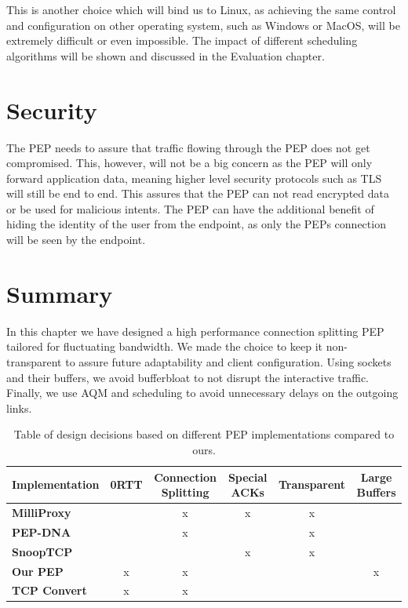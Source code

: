 \documentclass[a4paper,english, 11pt]{report}
\begin{document}
This is another choice which will bind us to Linux, as achieving the same control and configuration on other operating system, such as Windows or MacOS, will be extremely difficult or even impossible. The impact of different scheduling algorithms will be shown and discussed in the Evaluation chapter.

\section{Security}
The PEP needs to assure that traffic flowing through the PEP does not get compromised. This, however, will not be a big concern as the PEP will only forward application data, meaning higher level security protocols such as TLS will still be end to end. This assures that the PEP can not read encrypted data or be used for malicious intents. The PEP can have the additional benefit of hiding the identity of the user from the endpoint, as only the PEPs connection will be seen by the endpoint.

\section{Summary}
In this chapter we have designed a high performance connection splitting PEP tailored for fluctuating bandwidth. We made the choice to keep it non-transparent to assure future adaptability and client configuration. Using sockets and their buffers, we avoid bufferbloat to not disrupt the interactive traffic. Finally, we use AQM and scheduling to avoid unnecessary delays on the outgoing links.\\

\begin{table}[h!]
\centering
\begin{tabularx}{\linewidth}{lCCCCC}
\toprule
Implementation & 0RTT & Connection Splitting & Special ACKs & Transparent & Large Buffers \\
\midrule
\textbf{MilliProxy} &  & x & x & x &  \\
\textbf{PEP-DNA} &  & x &  & x &  \\
\textbf{SnoopTCP} &  &  & x & x &  \\
\textbf{Our PEP} & x & x &  &  & x \\
\textbf{TCP Convert} & x & x &  &  &  \\
\bottomrule
\end{tabularx}
\caption{Table of design decisions based on different PEP implementations compared to ours.}
\label{tab:summary}
\end{table}
\end{document}

